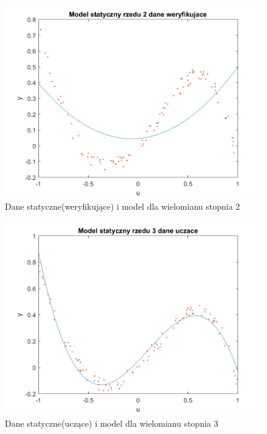 \documentclass{article}
\begin{document}
\begin{figure}
\centering
\includegraphics[width=0.95\linewidth]{dane_statyczne_model_rzedu_2_weryf}
\caption{Dane statyczne(weryfikujące) i model dla wielomianu stopnia 2}
\label{fig:danestatyczneweryf2}
\end{figure}

\begin{figure}
\centering
\includegraphics[width=0.95\linewidth]{dane_statyczne_model_rzedu_3_uczace}
\caption{Dane statyczne(uczące) i model dla wielomianu stopnia 3}
\label{fig:danestatyczneuczace3}
\end{figure}
\end{document}
